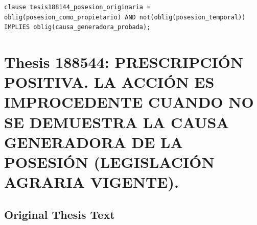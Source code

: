 \documentclass[11pt,a4paper]{article}
\begin{document}
\begin{lstlisting}[style=witnessstyle, language=Witness]
clause tesis188144_posesion_originaria = oblig(posesion_como_propietario) AND not(oblig(posesion_temporal)) IMPLIES oblig(causa_generadora_probada);
\end{lstlisting}

\newpage

\section{Thesis 188544: PRESCRIPCIÓN POSITIVA. LA ACCIÓN ES IMPROCEDENTE CUANDO NO SE DEMUESTRA LA CAUSA GENERADORA DE LA POSESIÓN (LEGISLACIÓN AGRARIA VIGENTE).}
\label{thesis:188544}

\subsection{Original Thesis Text}
\end{document}
